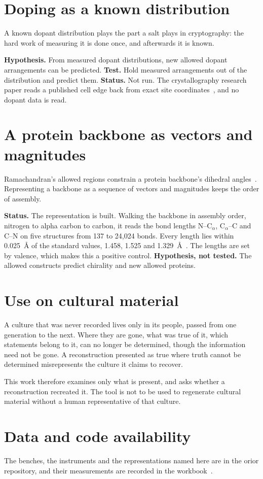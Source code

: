 \section{Doping as a known distribution}

A known dopant distribution plays the part a salt plays in cryptography: the hard work of measuring it
is done once, and afterwards it is known.

\textbf{Hypothesis.} From measured dopant distributions, new allowed dopant arrangements can be
predicted. \textbf{Test.} Hold measured arrangements out of the distribution and predict them.
\textbf{Status.} Not run. The crystallography research paper reads a published cell edge back from
exact site coordinates~\cite{src:Quigg-crystallography}, and no dopant data is read.

\section{A protein backbone as vectors and magnitudes}

Ramachandran's allowed regions constrain a protein backbone's dihedral
angles~\cite{src:Ramachandran-1963}. Representing a backbone as a sequence of vectors and magnitudes
keeps the order of assembly.

\textbf{Status.} The representation is built. Walking the backbone in assembly order, nitrogen to
alpha carbon to carbon, it reads the bond lengths N--C\(_\alpha\), C\(_\alpha\)--C and C--N on five
structures from 137 to 24{,}024 bonds. Every length lies within 0.025~\AA{} of the standard values,
1.458, 1.525 and 1.329~\AA~\cite{src:Engh-Huber-1991,src:Quigg-orior-workbook}. The lengths are set by
valence, which makes this a positive control. \textbf{Hypothesis, not tested.} The allowed constructs predict
chirality and new allowed proteins.

\section{Use on cultural material}

A culture that was never recorded lives only in its people, passed from one generation to the next.
Where they are gone, what was true of it, which statements belong to it, can no longer be determined,
though the information need not be gone. A reconstruction presented as true where truth cannot be
determined misrepresents the culture it claims to recover.

This work therefore examines only what is present, and asks whether a reconstruction recreated it. The
tool is not to be used to regenerate cultural material without a human representative of that
culture.

\section{Data and code availability}

The benches, the instruments and the representations named here are in the orior repository, and their
measurements are recorded in the workbook~\cite{src:Quigg-orior-workbook}.
